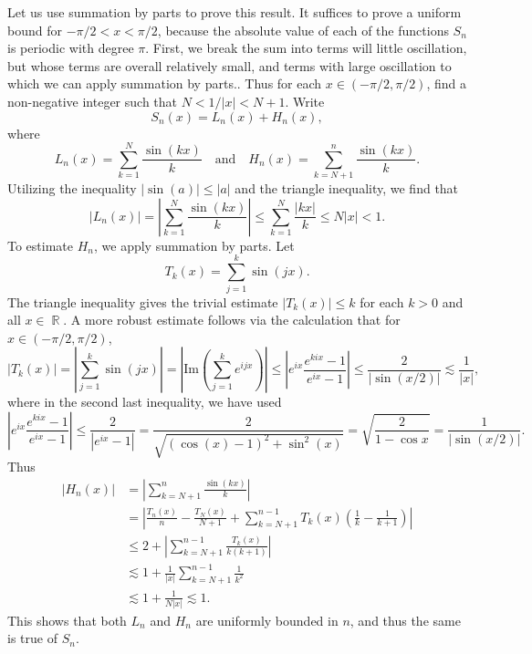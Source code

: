 \documentclass{exam}
\DeclareMathOperator{\RR}{\mathbb{R}}
\theoremstyle{problemstyle}
\newcommand{\1}[1]{\textbf{1}_{\left[#1\right]}} %
\begin{document}
\begin{questions}
\begin{solution}
Let us use summation by parts to prove this result. It suffices to prove a uniform bound for $-\pi/2 < x < \pi/2$, because the absolute value of each of the functions $S_n$ is periodic with degree $\pi$. First, we break the sum into terms will little oscillation, but whose terms are overall relatively small, and terms with large oscillation to which we can apply summation by parts.. Thus for each $x \in (-\pi/2,\pi/2)$, find a non-negative integer such that $N < 1/|x| < N+1$. Write
%
\[ S_n(x) = L_n(x) + H_n(x), \]
%
where
%
\[ L_n(x) = \sum_{k = 1}^N \frac{\sin(kx)}{k} \quad\text{and}\quad H_n(x) = \sum_{k = N+1}^n \frac{\sin(kx)}{k}. \]
%
Utilizing the inequality $|\sin(a)| \leq |a|$ and the triangle inequality, we find that
%
\begin{equation*}
  |L_n(x)| = \left| \sum_{k=1}^{N}\frac{\sin(kx)}{k} \right|\leq \sum_{k=1}^{N}\frac{|kx|}{k}\leq N|x|<1.
\end{equation*}
%
To estimate $H_n$, we apply summation by parts. Let
%
\[ T_k(x) = \sum_{j = 1}^k \sin(jx). \]
%
The triangle inequality gives the trivial estimate $|T_k(x)| \leq k$ for each $k > 0$ and all $x \in \RR$. A more robust estimate follows via the calculation that for $x \in (-\pi/2,\pi/2)$,
%
\begin{equation*}
  |T_k(x)| = \left| \sum_{j=1}^{k}\sin(jx) \right| = \left| \text{Im} \left( \sum_{j=1}^{k}e^{ijx} \right) \right|\leq \left| e^{ix} \frac{ e^{kix} - 1}{e^{ix} - 1}\right| \leq \frac{2}{|\sin (x/2)|} \lesssim \frac{1}{|x|},
\end{equation*}
%
where in the second last inequality, we have used
%
\begin{equation*}
  \left| e^{ix}\frac{e^{kix}-1}{e^{ix}-1} \right|
  \leq \frac{2}{\left| e^{ix}-1 \right|}
  = \frac{2}{\sqrt{( \cos(x)-1 )^{2}+ \sin^{2}(x)}}
  = \sqrt{\frac{2}{1-\cos x}}
  = \frac{1}{|\sin (x/2)|}.
\end{equation*}
%
Thus
%
\begin{align*}
  |H_n(x)| &= \left| \sum_{k=N+1}^{n}\frac{\sin(kx)}{k} \right|\\
          &= \left| \frac{T_n(x)}{n}-\frac{T_N(x)}{N+1} + \sum_{k=N+1}^{n-1}T_k(x) \left(\frac{1}{k}-\frac{1}{k+1}  \right) \right|\\
         &\leq 2 + \left| \sum_{k=N+1}^{n-1}\frac{T_k(x)}{k(k+1)} \right|\\
         &\lesssim 1 + \frac{1}{|x|} \sum_{k = N+1}^{n-1} \frac{1}{k^2}\\
         &\lesssim 1 + \frac{1}{N |x|} \lesssim 1.
\end{align*}
%
This shows that both $L_n$ and $H_n$ are uniformly bounded in $n$, and thus the same is true of $S_n$.


\end{solution}
\end{questions}
\end{document}
